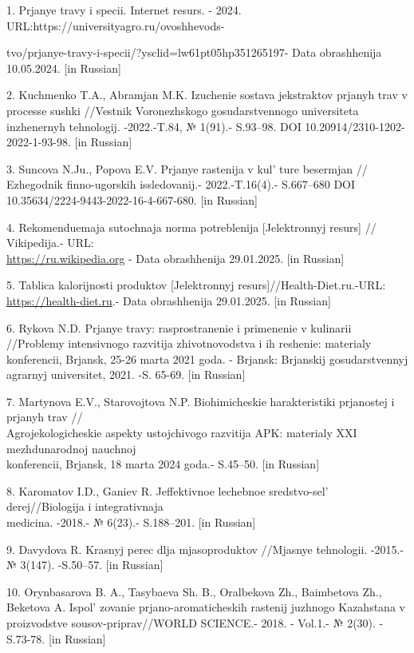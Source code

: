 \begin{references}
1. Prjanye travy i specii. Internet resurs. - 2024.
URL:https://universityagro.ru/ovoshhevods-

tvo/prjanye-travy-i-specii/?ysclid=lw61pt05hp351265197- Data
obrashhenija 10.05.2024. {[}in Russian{]}

2. Kuchmenko T.A., Abramjan M.K. Izuchenie sostava jekstraktov prjanyh
trav v processe sushki //Vestnik Voronezhskogo gosudarstvennogo
universiteta inzhenernyh tehnologij. -2022.-T.84, № 1(91).- S.93--98.
DOI 10.20914/2310-1202-2022-1-93-98. {[}in Russian{]}

3. Suncova N.Ju., Popova E.V. Prjanye rastenija v
kul' ture besermjan // Ezhegodnik finno-ugorskih
issledovanij.- 2022.-T.16(4).- S.667--680 DOI
10.35634/2224-9443-2022-16-4-667-680. {[}in Russian{]}

4. Rekomenduemaja sutochnaja norma potreblenija {[}Jelektronnyj
resurs{]} // Vikipedija.- URL:\\
\href{https://ru.wikipedia.org/wiki/Rekomenduemaja\_sutochnaja\_norma\_potreblenija}{https://ru.wikipedia.org} -
Data obrashhenija 29.01.2025. {[}in Russian{]}

5. Tablica kalorijnosti produktov {[}Jelektronnyj
resurs{]}//Health-Diet.ru.-URL:
\href{https://health-diet.ru/table\_calorie\_users/2314523/}{https://health-diet.ru}.- Data
obrashhenija 29.01.2025. {[}in Russian{]}

6. Rykova N.D. Prjanye travy: rasprostranenie i primenenie v kulinarii
//Problemy intensivnogo razvitija zhivotnovodstva i ih reshenie:
materialy konferencii, Brjansk, 25-26 marta 2021 goda. - Brjansk:
Brjanskij gosudarstvennyj agrarnyj universitet, 2021. -S.
65-69. {[}in Russian{]}

7. Martynova E.V., Starovojtova N.P. Biohimicheskie harakteristiki
prjanostej i prjanyh trav // \\Agrojekologicheskie aspekty ustojchivogo
razvitija APK: materialy XXI mezhdunarodnoj nauchnoj \\konferencii,
Brjansk, 18 marta 2024 goda.- S.45--50. {[}in Russian{]}

8. Karomatov I.D., Ganiev R. Jeffektivnoe lechebnoe
sredstvo-sel' derej//Biologija i integrativnaja \\medicina.
-2018.- № 6(23).- S.188--201. {[}in Russian{]}

9. Davydova R. Krasnyj perec dlja mjasoproduktov //Mjasnye tehnologii.
-2015.- № 3(147). -S.50--57. {[}in Russian{]}

10. Orynbasarova B. A., Tasybaeva Sh. B., Oralbekova Zh., Baimbetova Zh.,
Beketova A. Ispol' zovanie prjano-aromaticheskih rastenij
juzhnogo Kazahstana v proizvodstve sousov-priprav//WORLD SCIENCE.-
2018. - Vol.1.- № 2(30). - S.73-78. {[}in Russian{]}


\end{references}

